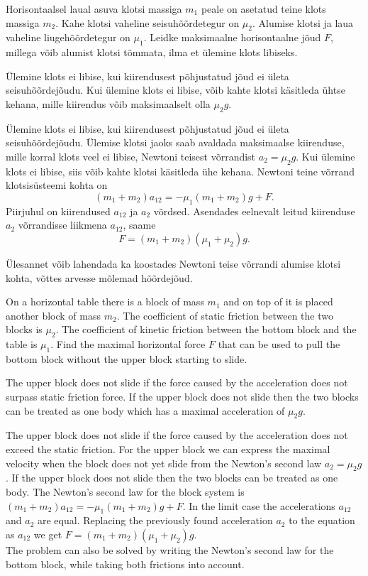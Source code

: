 
Horisontaalsel laual asuva klotsi massiga $m_1$ peale on asetatud teine klots massiga $m_2$. Kahe klotsi vaheline seisuhõõrdetegur on $\mu_2$. Alumise klotsi ja laua vaheline liugehõõrdetegur on $\mu_1$. Leidke maksimaalne horisontaalne jõud $F$, millega võib alumist klotsi tõmmata, ilma et ülemine klots libiseks.

\hint
Ülemine klots ei libise, kui kiirendusest põhjustatud jõud ei ületa seisuhõõrdejõudu. Kui ülemine klots ei libise, võib kahte klotsi käsitleda ühtse kehana, mille kiirendus võib maksimaalselt olla $\mu_2g$.

\solu
Ülemine klots ei libise, kui kiirendusest põhjustatud jõud ei ületa seisuhõõrdejõudu. Ülemise klotsi jaoks saab avaldada maksimaalse kiirenduse, mille korral klots veel ei libise, Newtoni teisest võrrandist $a_2=\mu_2g$. Kui ülemine klots ei libise, siis võib kahte klotsi käsitleda ühe kehana. Newtoni teine võrrand klotsisüsteemi kohta on 
\[
(m_1+m_2)a_{12} = -\mu_1 (m_1+m_2)g+F.
\]
Piirjuhul on kiirendused $a_{12}$ ja $a_2$ võrdsed. Asendades eelnevalt leitud kiirenduse $a_2$ võrrandisse liikmena $a_{12}$, saame
\[
F=(m_1+m_2)(\mu_1+\mu_2)g.
\]


Ülesannet võib lahendada ka koostades Newtoni teise võrrandi alumise klotsi kohta, võttes arvesse mõlemad hõõrdejõud. 

On a horizontal table there is a block of mass $m_1$ and on top of it is placed another block of mass $m_2$. The coefficient of static friction between the two blocks is $\mu_2$. The coefficient of kinetic friction between the bottom block and the table is $\mu_1$. Find the maximal horizontal force $F$ that can be used to pull the bottom block without the upper block starting to slide.

\hinteng
The upper block does not slide if the force caused by the acceleration does not surpass static friction force. If the upper block does not slide then the two blocks can be treated as one body which has a maximal acceleration of $\mu_2g$.

\solueng
The upper block does not slide if the force caused by the acceleration does not exceed the static friction. For the upper block we can express the maximal velocity when the block does not yet slide from the Newton’s second law $a_2=\mu_2g$. If the upper block does not slide then the two blocks can be treated as one body. The Newton’s second law for the block system is $(m_1+m_2)a_{12} = -\mu_1 (m_1+m_2)g+F$. In the limit case the accelerations $a_{12}$ and $a_2$ are equal. Replacing the previously found acceleration $a_2$ to the equation as $a_{12}$ we get $F=(m_1+m_2)(\mu_1+\mu_2)g$.\\
The problem can also be solved by writing the Newton’s second law for the bottom block, while taking both frictions into account.
\probend